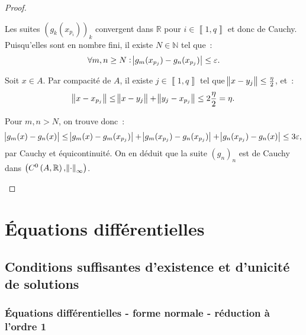\documentclass{report}
\theoremstyle{definition}
\theoremstyle{remark}
\numberwithin{equation}{section}
\newcommand{\R}{\mathbb R}
\newcommand{\N}{\mathbb N}
\newcommand{\intint}[2]{\left\llbracket#1, #2\right\rrbracket}
\newcommand{\evfn}[3]{\left(#1\left(#2, #3\right), \norm {\cdot}_{\infty}\right)}
\newcommand{\evnC}[3]{{\evfn {C^{#1}}{#2}{#3}}}
\begin{document}
\begin{proof}
\begin{itemize}
				Les suites $(g_k(x_{p_i}))_k$ convergent dans $\R$ pour $i \in \intint 1q$ et donc de Cauchy. Puisqu'elles sont en nombre fini, il existe
				$N \in \N$ tel que~:
				\begin{equation}
					\forall m, n \geq N : \abs {g_m(x_{p_j})-g_n(x_{p_j})} \leq \varepsilon.
				\end{equation}

				Soit $x \in A$. Par compacité de $A$, il existe $j \in \intint 1q$ tel que $\norm {x-y_j} \leq \frac \eta2$, et~:
				\begin{equation}
					\norm {x-x_{p_j}} \leq \norm {x - y_j} + \norm {y_j - x_{p_j}} \leq 2\frac \eta2 = \eta.
				\end{equation}

				Pour $m, n > N$, on trouve donc~:
				\begin{equation}
					\abs {g_m(x)-g_n(x)} \leq \abs {g_m(x) - g_m(x_{p_j})} + \abs {g_m(x_{p_j}) - g_n(x_{p_j})} + \abs {g_n(x_{p_j}) - g_n(x)} \leq 3\varepsilon,
				\end{equation}
				par Cauchy et équicontinuité. On en déduit que la suite $(g_n)_n$ est de Cauchy dans $\evnC0A\R$.
			\end{itemize}
			\end{proof}

\part{Équations différentielles}
\chapter{Conditions suffisantes d'existence et d'unicité de solutions}
	\section{Équations différentielles - forme normale - réduction à l'ordre 1}
\end{document}
